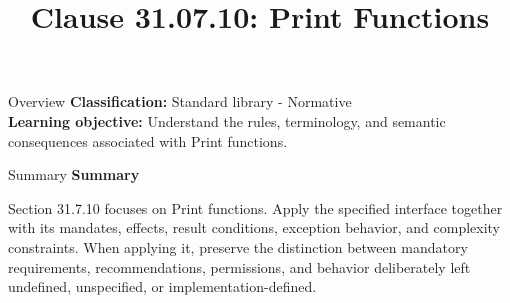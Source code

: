 \documentclass[10pt,letterpaper]{article}
\title{Clause 31.07.10: Print Functions}
\author{}
\date{}
\begin{document}
\maketitle
\begin{CornellOverviewBox}{Overview}
\textbf{Classification:} Standard library - Normative\\[2pt]
\textbf{Learning objective:} Understand the rules, terminology, and semantic consequences associated with Print functions.
\end{CornellOverviewBox}\begin{CornellSummaryBox}{Summary}
{\sffamily\bfseries\color{Accent} Summary}\par\vspace{3pt}Section 31.7.10 focuses on Print functions. Apply the specified interface together with its mandates, effects, result conditions, exception behavior, and complexity constraints. When applying it, preserve the distinction between mandatory requirements, recommendations, permissions, and behavior deliberately left undefined, unspecified, or implementation-defined.
\end{CornellSummaryBox}
\end{document}
